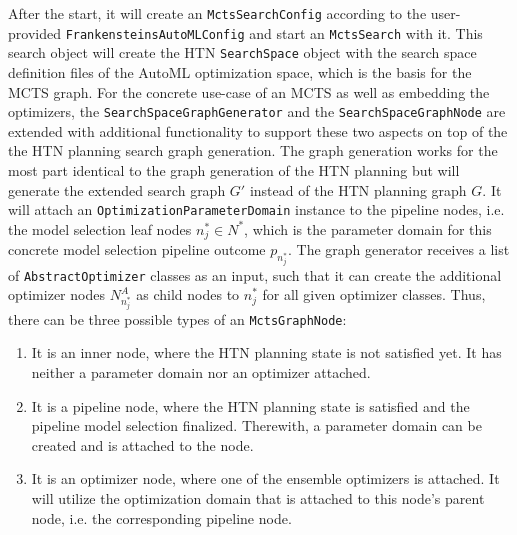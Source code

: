 After the start, it will create an \texttt{MctsSearchConfig} according to the user-provided \texttt{FrankensteinsAutoMLConfig} and start an \texttt{MctsSearch} with it.
This search object will create the HTN \texttt{SearchSpace} object with the search space definition files of the AutoML optimization space, which is the basis for the MCTS graph.\newline
For the concrete use-case of an MCTS as well as embedding the optimizers, the \texttt{SearchSpaceGraphGenerator} and the \texttt{SearchSpaceGraphNode} are extended with additional functionality to support these two aspects on top of the the HTN planning search graph generation.
The graph generation works for the most part identical to the graph generation of the HTN planning but will generate the extended search graph $G'$ instead of the HTN planning graph $G$.
It will attach an \texttt{OptimizationParameterDomain} instance to the pipeline nodes, i.e. the model selection leaf nodes $n^*_j \in N^*$, which is the parameter domain for this concrete model selection pipeline outcome $p_{n^*_j}$.
The graph generator receives a list of \texttt{AbstractOptimizer} classes as an input, such that it can create the additional optimizer nodes $N^A_{n^*_j}$ as child nodes to $n^*_j$ for all given optimizer classes.
Thus, there can be three possible types of an \texttt{MctsGraphNode}:
\begin{enumerate}
    \item It is an inner node, where the HTN planning state is not satisfied yet. It has neither a parameter domain nor an optimizer attached.
    \item It is a pipeline node, where the HTN planning state is satisfied and the pipeline model selection finalized. Therewith, a parameter domain can be created and is attached to the node.
    \item It is an optimizer node, where one of the ensemble optimizers is attached. It will utilize the optimization domain that is attached to this node's parent node, i.e. the corresponding pipeline node.
\end{enumerate}

